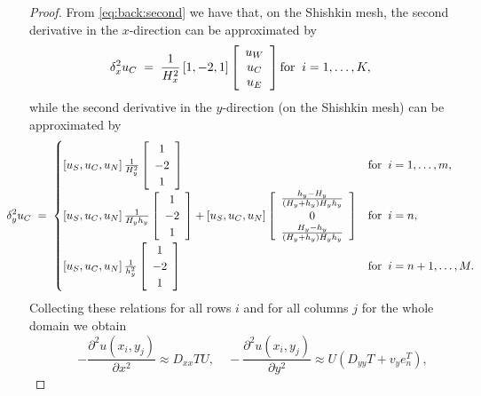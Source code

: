 \begin{proof}
From \eqref{eq:back:second} we have that, on the Shishkin mesh, the second derivative in the $x$-direction can be approximated by
\begin{equation*}\label{eq:secondx}
\hspace*{-2em}\delta^{2}_{x} u_{C}\; =\;
\frac{1}{H_x^2}\left[1,-2,1\right]\left[\begin{array}{c} u_W\\u_C\\u_E\end{array}\right] \mbox{for}\;\; i=1,\ldots, K,
\end{equation*}
while the second derivative in the $y$-direction (on the Shishkin mesh) can be approximated by
\begin{equation*}\label{eq:secondy}
\hspace*{-2em}\delta^{2}_{y} u_{C}\; =\;
\begin{cases} \left[u_S,u_C,u_N\right]\frac{1}{H_y^2}\left[\begin{array}{c} 1\\-2\\1\end{array}\right] &\mbox{for}\;\; i=1,\ldots, m, \\
\left[u_S,u_C,u_N\right]\frac{1}{H_yh_y}\left[\begin{array}{c} 1\\-2\\1\end{array}\right] + \left[u_S,u_C,u_N\right]\left[\begin{array}{c}\frac{h_y-H_y}{(H_y+h_y)H_yh_y} \\0\\\frac{H_y-h_y}{(H_y+h_y)H_yh_y}\end{array}\right] &\mbox{for}\;\; i=n,\\
\left[u_S,u_C,u_N\right]\frac{1}{h_y^2}\left[\begin{array}{c} 1\\-2\\1\end{array}\right] &\mbox{for}\;\; i=n+1,\ldots, M.\end{cases}
\end{equation*}
Collecting these relations for all rows $i$ and for all columns $j$ for the whole domain we obtain
\[
-\frac{\partial^2 u(x_i,y_j)}{\partial x^2}\approx D_{xx}TU,\quad -\frac{\partial^2 u(x_i,y_j)}{\partial y^2}\approx U(D_{yy}T+v_ye_n^T),
\]

\end{proof}

